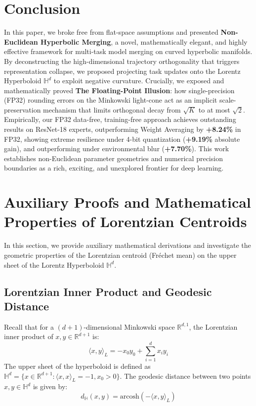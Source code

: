 \documentclass{article}
\theoremstyle{plain}
\theoremstyle{definition}
\theoremstyle{remark}
\begin{document}
\section{Conclusion}
In this paper, we broke free from flat-space assumptions and presented \textbf{Non-Euclidean Hyperbolic Merging}, a novel, mathematically elegant, and highly effective framework for multi-task model merging on curved hyperbolic manifolds. By deconstructing the high-dimensional trajectory orthogonality that triggers representation collapse, we proposed projecting task updates onto the Lorentz Hyperboloid $\mathbb{H}^d$ to exploit negative curvature. Crucially, we exposed and mathematically proved \textbf{The Floating-Point Illusion}: how single-precision (FP32) rounding errors on the Minkowski light-cone act as an implicit scale-preservation mechanism that limits orthogonal decay from $\sqrt{K}$ to at most $\sqrt{2}$. Empirically, our FP32 data-free, training-free approach achieves outstanding results on ResNet-18 experts, outperforming Weight Averaging by \textbf{+8.24\%} in FP32, showing extreme resilience under 4-bit quantization (\textbf{+9.19\%} absolute gain), and outperforming under environmental blur (\textbf{+7.70\%}). This work establishes non-Euclidean parameter geometries and numerical precision boundaries as a rich, exciting, and unexplored frontier for deep learning.

\clearpage
\nocite{*}



\clearpage
\appendix
\onecolumn

\section{Auxiliary Proofs and Mathematical Properties of Lorentzian Centroids}
In this section, we provide auxiliary mathematical derivations and investigate the geometric properties of the Lorentzian centroid (Fréchet mean) on the upper sheet of the Lorentz Hyperboloid $\mathbb{H}^d$.

\subsection{Lorentzian Inner Product and Geodesic Distance}
Recall that for a $(d+1)$-dimensional Minkowski space $\mathbb{R}^{d, 1}$, the Lorentzian inner product of $x, y \in \mathbb{R}^{d+1}$ is:
$$\langle x, y \rangle_L = -x_0 y_0 + \sum_{i=1}^d x_i y_i$$
The upper sheet of the hyperboloid is defined as $\mathbb{H}^d = \{ x \in \mathbb{R}^{d+1} : \langle x, x \rangle_L = -1, x_0 > 0 \}$. The geodesic distance between two points $x, y \in \mathbb{H}^d$ is given by:
$$d_{\mathbb{H}}(x, y) = \text{arcosh}(-\langle x, y \rangle_L)$$
\end{document}
